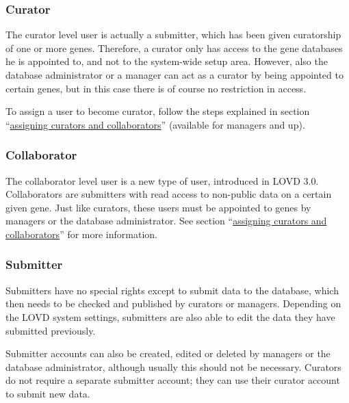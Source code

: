 \documentclass[a4paper,oneside,openany,12pt]{memoir}
\begin{document}
\subsubsection{Curator}
The curator level user is actually a submitter, which has been given curatorship of one or more genes.
Therefore, a curator only has access to the gene databases he is appointed to, and not to the system-wide setup area.
However, also the database administrator or a manager can act as a curator by being appointed to certain genes, but in this case there is of course no restriction in access.
\\
\par
To assign a user to become curator, follow the steps explained in section ``\hyperlink{s_gene_assign_curators}{assigning curators and collaborators}'' (available for managers and up).

\subsubsection{Collaborator}
The collaborator level user is a new type of user, introduced in LOVD 3.0.
Collaborators are submitters with read access to non-public data on a certain given gene.
Just like curators, these users must be appointed to genes by managers or the database administrator.
See section ``\hyperlink{s_gene_assign_curators}{assigning curators and collaborators}'' for more information.

\subsubsection{Submitter}
Submitters have no special rights except to submit data to the database, which then needs to be checked and published by curators or managers.
Depending on the LOVD system settings, submitters are also able to edit the data they have submitted previously.
\par
Submitter accounts can also be created, edited or deleted by managers or the database administrator, although usually this should not be necessary.
Curators do not require a separate submitter account; they can use their curator account to submit new data.
\end{document}
